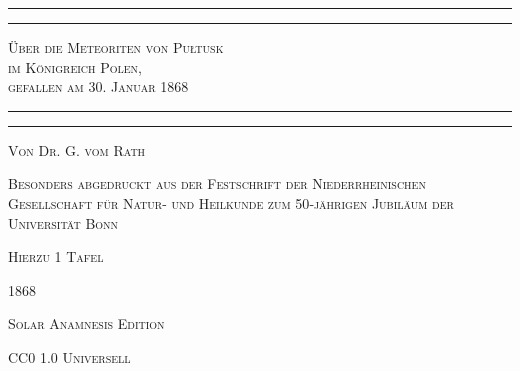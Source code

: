 \documentclass[a4paper, 11pt, oneside, german]{article}
\begin{document}
\begin{titlepage} %
	\centering %

	
	\rule{\textwidth}{1.6pt}\vspace*{-\baselineskip}\vspace*{2pt} %
	\rule{\textwidth}{0.4pt} %
	
	\vspace{1\baselineskip} %
	
	{\scshape\LARGE Über die Meteoriten von Pułtusk\\ im Königreich Polen,\\ gefallen am 30. Januar 1868\\[1.25pt]}
	
	\vspace{1\baselineskip} %

	\rule{\textwidth}{0.4pt}\vspace*{-\baselineskip}\vspace{3.2pt} %
	\rule{\textwidth}{1.6pt} %
	
	\vspace{1\baselineskip} %
	
	
	{\scshape\small Von \large Dr. G. vom Rath} %
	
	\vspace*{1\baselineskip} %
	
    {\scshape\small Besonders abgedruckt aus der Festschrift der Niederrheinischen Gesellschaft für Natur- und Heilkunde zum 50‑jährigen Jubiläum der Universität Bonn} %
    
    \vspace*{1\baselineskip} %
    	
    {\scshape\small Hierzu 1 Tafel} %
	
    \vspace*{\fill}

	\vspace{1\baselineskip}

	{\small\scshape 1868}
		
	\vspace{0.5\baselineskip} %

    {\scshape Solar Anamnesis Edition}  %
	
	{\scshape\small CC0 1.0 Universell} %
\end{titlepage}
\setlength{\parskip}{1mm plus1mm minus1mm}
\clearpage
\end{document}
